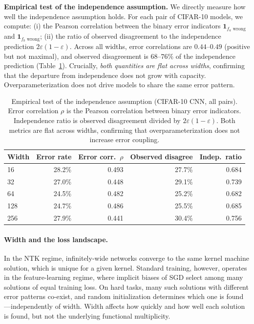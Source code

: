 \documentclass[11pt]{article}
\begin{document}
\textbf{Empirical test of the independence assumption.}
We directly measure how well the independence assumption holds.  For each
pair of CIFAR-10 models, we compute: (i) the Pearson correlation between
the binary error indicators $\mathbf{1}_{f_a \text{ wrong}}$ and
$\mathbf{1}_{f_b \text{ wrong}}$; (ii) the ratio of observed disagreement
to the independence prediction $2\varepsilon(1-\varepsilon)$.  Across all
widths, error correlations are $0.44$--$0.49$ (positive but not maximal),
and observed disagreement is $68$--$76\%$ of the independence prediction
(Table~\ref{tab:indep}).  Crucially, \emph{both quantities are flat across
widths}, confirming that the departure from independence does not grow with
capacity.  Overparameterization does not drive models to share the same
error pattern.

\begin{table}[h]
\centering
\small
\begin{tabular}{lrrrr}
\toprule
Width & Error rate & Error corr.\ $\rho$ & Observed disagree & Indep.\ ratio\\
\midrule
16  & 28.2\% & 0.493 & 27.7\% & 0.684\\
32  & 27.0\% & 0.448 & 29.1\% & 0.739\\
64  & 24.5\% & 0.482 & 25.2\% & 0.682\\
128 & 24.7\% & 0.486 & 25.5\% & 0.685\\
256 & 27.9\% & 0.441 & 30.4\% & 0.756\\
\bottomrule
\end{tabular}
\caption{Empirical test of the independence assumption (CIFAR-10 CNN, all pairs).
Error correlation $\rho$ is the Pearson correlation between binary error indicators.
Independence ratio is observed disagreement divided by $2\varepsilon(1-\varepsilon)$.
Both metrics are flat across widths, confirming that overparameterization
does not increase error coupling.}
\label{tab:indep}
\end{table}

\paragraph{Width and the loss landscape.}
In the NTK regime, infinitely-wide networks converge to the same kernel
machine solution, which is unique for a given kernel.  Standard training,
however, operates in the feature-learning regime, where implicit biases
of SGD select among many solutions of equal training loss.  On hard tasks,
many such solutions with different error patterns co-exist, and random
initialization determines which one is found—independently of width.
Width affects how quickly and how well each solution is found, but not
the underlying functional multiplicity.
\end{document}
